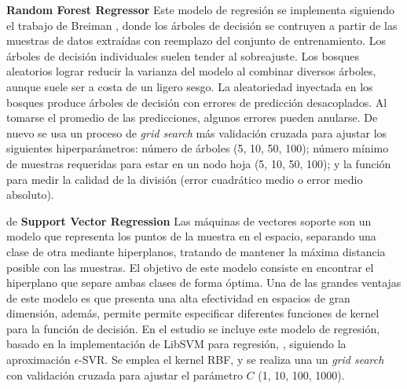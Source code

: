 \vspace{0.5cm}

\textbf{Random Forest Regressor} {} Este modelo de regresión se implementa siguiendo el trabajo de Breiman \cite{Breiman2001}, donde los árboles de decisión se contruyen a partir de las muestras de datos extraídas con reemplazo del conjunto de entrenamiento. Los árboles de decisión individuales suelen tender al sobreajuste. Los bosques aleatorios lograr reducir la varianza del modelo al combinar diversos árboles, aunque suele ser a costa de un ligero sesgo. La aleatoriedad inyectada en los bosques produce árboles de decisión con errores de predicción desacoplados. Al tomarse el promedio de las predicciones, algunos errores pueden anularse. %
De nuevo se usa un proceso de \emph{grid search} más validación cruzada para ajustar los siguientes hiperparámetros: número de árboles (5, 10, 50, 100); número mínimo de muestras requeridas para estar en un nodo hoja (5, 10, 50, 100); y la función para medir la calidad de la división (error cuadrático medio o error medio absoluto).

\vspace{0.5cm}
de
\textbf{Support Vector Regression} {} Las máquinas de vectores soporte son un modelo que representa los puntos de la muestra en el espacio, separando una clase de otra mediante hiperplanos, tratando de mantener la máxima distancia posible con las muestras. El objetivo de este modelo consiste en encontrar el hiperplano que separe ambas clases de forma óptima. Una de las grandes ventajas de este modelo es que presenta una alta efectividad en espacios de gran dimensión, además, permite permite especificar diferentes funciones de kernel para la función de decisión. En el estudio se incluye este modelo de regresión, basado en la implementación de LibSVM para regresión, \cite{LIBSVM}, siguiendo la aproximación $\epsilon$-SVR. %
Se emplea el kernel RBF, y se realiza una un \emph{grid search} con validación cruzada para ajustar el parámetro $C$ (1, 10, 100, 1000).

\vspace{0.5cm}

